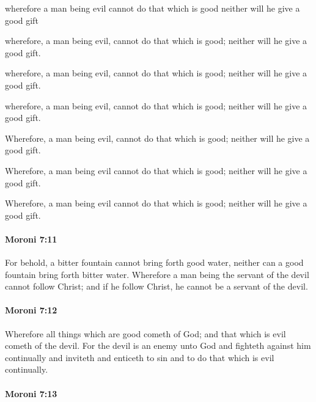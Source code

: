 			\begin{framed}
				\scriptsize
				\begin{compactdesc}
					\item[OM] [\textit{missing}]
					\item[PM] wherefore a man being evil cannot do that which is good neither will he give a good gift
					\item[1830] wherefore, a man being evil, cannot do that which is good; neither will he give a good gift.
					\item[1837] wherefore, a man being evil, cannot do that which is good; neither will he give a good gift.
					\item[1840] wherefore, a man being evil, cannot do that which is good; neither will he give a good gift.
					\item[1879] Wherefore, a man being evil, cannot do that which is good; neither will he give a good gift.
					\item[1981] Wherefore, a man being evil cannot do that which is good; neither will he give a good gift.
					\item[ABM] Wherefore, a man being evil cannot do that which is good; neither will he give a good gift. 
				\end{compactdesc}
			\end{framed}

		\paragraph{Moroni 7:11} %
			\label{MORONI-7-11}

			For behold, a bitter fountain cannot bring forth good water,
			neither can a good fountain bring forth bitter water.
			Wherefore a man being the servant of the devil cannot follow Christ;
			and if he follow Christ, he cannot be a servant of the devil.

		\paragraph{Moroni 7:12} %
			\label{MORONI-7-12}

			Wherefore all things which are good cometh of God;
			and that which is evil cometh of the devil.
			For the devil is an enemy unto God and fighteth against him continually
			and inviteth and enticeth to sin and to do that which is evil continually.

		\paragraph{Moroni 7:13} %
			\label{MORONI-7-13}

